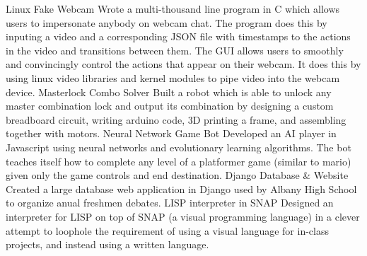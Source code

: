 


\begin{cvskills}

  \vspace{1mm}
  \cvskill
    {Linux Fake Webcam} %
    {Wrote a multi-thousand line program in C which allows users to impersonate anybody on webcam chat. The program does this by inputing a video and a corresponding JSON file with timestamps to the actions in the video and transitions between them. The GUI allows users to smoothly and convincingly control the actions that appear on their webcam. It does this by using linux video libraries and kernel modules to pipe video into the webcam device.} %
  \vspace{1mm}
\cvskill
    {Masterlock Combo Solver} %
    {Built a robot which is able to unlock any master combination lock and output its combination by designing a custom breadboard circuit, writing arduino code, 3D printing a frame, and assembling together with motors.} %
  \vspace{1mm}
\cvskill
  {Neural Network Game Bot}
  {Developed an AI player in Javascript using neural networks and evolutionary learning algorithms. The bot teaches itself how to complete any level of a platformer game (similar to mario) given only the game controls and end destination.}
  \vspace{1mm}
  \cvskill
    {Django Database \& Website} %
    {Created a large database web application in Django used by Albany High School to organize anual freshmen debates.} %
  \cvskill
    {LISP interpreter in SNAP} %
    {Designed an interpreter for LISP on top of SNAP (a visual programming language) in a clever attempt to loophole the requirement of using a visual language for in-class projects, and instead using a written language.} %
  \vspace{1mm}

\end{cvskills}
